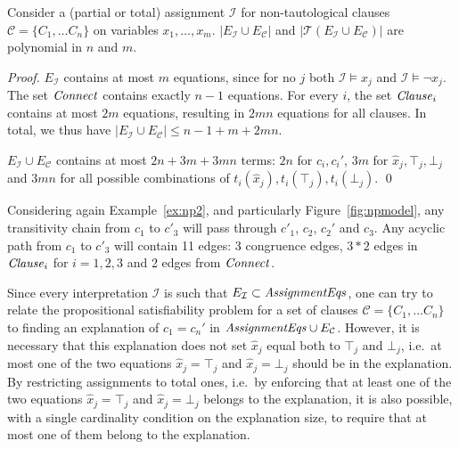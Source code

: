 \documentclass[smallextended]{svjour3}
\newcommand{\Assignment}{{\it AssignmentEqs}}
\newcommand{\Clause}{{\it Clause}}
\newcommand{\Connect}{{\it Connect}}
\begin{document}
\begin{lemma}
Consider a (partial or total) assignment $\mathcal{I}$ for 
non-tautological clauses $\mathcal{C}= \{C_1, \dots C_n\}$ on variables  $x_1,\ldots, x_m$. $|E_{\mathcal{I}} \cup E_\mathcal{C}|$ and
$|\mathcal{T}(E_{\mathcal{I}} \cup E_\mathcal{C})|$ are polynomial in $n$ and
$m$.
\end{lemma}

\begin{proof}
$E_{\mathcal{I}}$ contains at most $m$ equations, since for no $j$ both $\mathcal{I} \models x_j$ and $\mathcal{I} \models \neg x_j$.
The set $\Connect$ contains exactly $n-1$ equations.
For every $i$, the set $\Clause_i$ contains at most $2m$ equations, resulting in $2mn$ equations for all clauses.
In total, we thus have $|E_{\mathcal{I}} \cup E_\mathcal{C}| \leq n-1 + m + 2mn$.

$E_{\mathcal{I}} \cup E_\mathcal{C}$ contains at most $2n + 3m + 3mn$ terms: $2n$ for $c_i,c_i'$, $3m$ for $\hat{x}_j,\top_j,\bot_j$ and $3mn$ for all possible combinations of $t_i(\hat{x}_j),t_i(\top_j),t_i(\bot_j)$.
\qed
\end{proof}

\noindent 
Considering again Example~\ref{ex:np2}, and particularly
Figure~\ref{fig:npmodel}, any transitivity chain from $c_1$ to
$c'_3$ will pass through $c'_1$, $c_2$, $c_2'$ and
$c_3$.  Any acyclic path from $c_1$ to $c'_3$ will contain 11
edges: 3 congruence edges, $3*2$ edges in $\Clause_i$ for $i=1,2,3$
and 2 edges from $\Connect$.

Since every interpretation $\mathcal{I}$ is such that $E_{\mathcal{I}} \subset
\Assignment$, one can try to relate the propositional satisfiability
problem for a set of clauses $\mathcal{C}= \{C_1, \dots C_n\}$ to finding an
explanation of $c_1 = c_n'$ in $\Assignment \cup
E_{\mathcal{C}}$.  However, it is necessary that this explanation does not set
$\hat{x}_j$ equal both to $\top_j$ and $\bot_j$, i.e.\ at most one of the two
equations $\hat{x}_j = \top_j$ and $\hat{x}_j = \bot_j$ should be in the
explanation.  By restricting assignments to total ones, i.e.\ by enforcing that
at least one of the two equations $\hat{x}_j = \top_j$ and $\hat{x}_j = \bot_j$
belongs to the explanation, it is also possible, with a single cardinality
condition on the explanation size, to require that at most one of them 
belong to the explanation.
\end{document}
